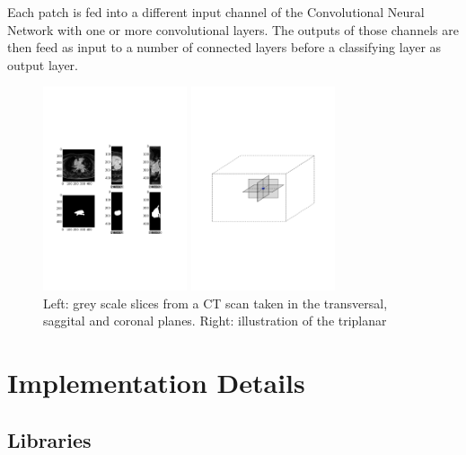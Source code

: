 Each patch is fed into a different input channel of the Convolutional Neural Network with one or more convolutional layers. The outputs of those channels are then feed as input to a number of connected layers before a classifying layer as output layer.

\begin{figure}
\centering
\begin{minipage}{0.45\textwidth}
\centering
\includegraphics[trim=2cm 8cm 2cm 8cm, clip=true, height=60mm]{Chapter2/example_slice.pdf}
\end{minipage}\hfill
\begin{minipage}{0.45\textwidth}
\centering
\includegraphics[trim=2cm 8cm 2cm 8cm, clip=true, height=60mm]{Chapter2/triplanar.pdf}
\end{minipage}
\caption{Left: grey scale slices from a CT scan taken in the transversal, saggital and coronal planes. Right: illustration of the triplanar}
\end{figure}

\section{Implementation Details}

\subsection{Libraries}

